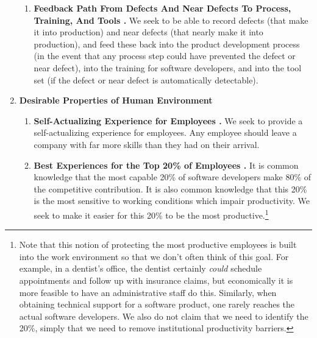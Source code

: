 \begin{enumerate}
\begin{enumerate}
\item \textbf{Feedback Path From Defects And Near Defects To Process, Training,
      And Tools
	  \desirablepropertyemit\label{dp:chgr0:soda0:feedbackpath}.}  
	  We seek to be able to record defects (that make it into
      production) and near defects (that nearly make it into production),
      and feed these back into the product development process 
	  (in the event that any process step could have prevented
      the defect or near defect), into the training for software developers, and into
      the tool set (if the defect or near defect is automatically detectable).

\end{enumerate}

\item \textbf{Desirable Properties of Human Environment}

\begin{enumerate}

\item \textbf{Self-Actualizing Experience for Employees
      \desirablepropertyemit\label{dp:chgr0:soda0:saexperience}.}  
	  We seek to provide a self-actualizing
      experience for employees.  Any employee should leave 
	  a company with far more skills
      than they had on their arrival.

\item \textbf{Best Experiences for the Top 20\% of Employees
      \desirablepropertyemit\label{dp:chgr0:soda0:betop20}.}  
	  It is common knowledge that the most
      capable 20\% of software developers make 80\% of the competitive contribution.
      It is also common knowledge that this 20\% is the most sensitive to working conditions
      which impair productivity.
      We seek to make it easier for this 20\% to be the most productive.\footnote{Note that this
      notion of protecting the most productive employees is built into the work environment
      so that we don't often think of this goal.  For example, in a dentist's office, the
      dentist certainly \emph{could} schedule appointments and follow up with insurance
      claims, but economically it is more feasible to have an administrative staff do
      this.  Similarly, when obtaining technical support for a software product, one rarely reaches  
      the actual software developers.  We also do not claim that we need to identify the
      20\%, simply that we need to remove institutional productivity barriers.}

\end{enumerate}


\end{enumerate}
